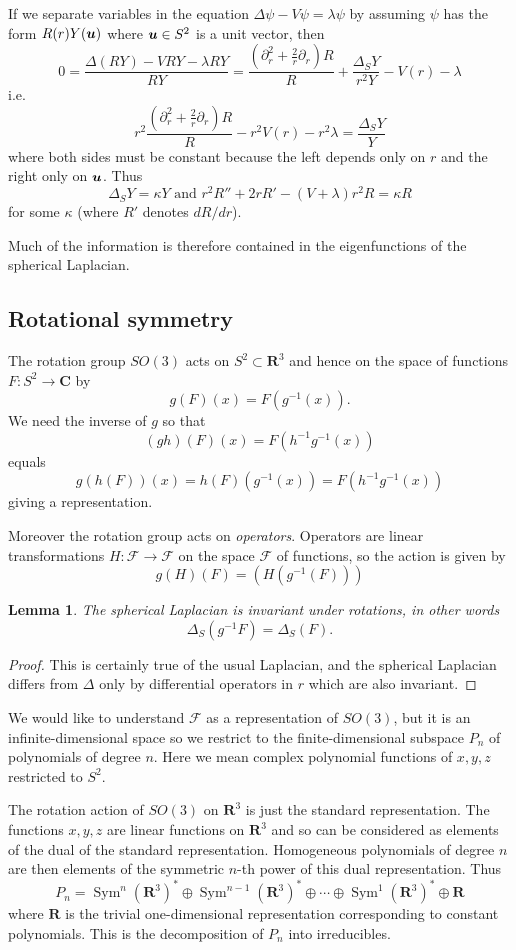 \documentclass[12pt]{article}
\renewcommand\vec[1]{\ensuremath\boldsymbol{#1}}
\newcommand{\CC}{\mathbf{C}}
\newcommand{\RR}{\mathbf{R}}
\newcommand{\OP}{\operatorname}
\newcommand{\Sym}{\OP{Sym}}
\newtheorem{lma}[thm]{Lemma}
\theoremstyle{definition}
\theoremstyle{check}
\theoremstyle{remark}
\theoremstyle{TheoremNum}
\begin{document}
If we separate variables in the equation $\Delta\psi-V\psi=\lambda\psi$ by assuming $\psi$ has the form $R(r)Y(\vec{u})$ where $\vec{u}\in S^2$ is a unit vector, then
\[0=\frac{\Delta(RY)-VRY-\lambda RY}{RY}=\frac{\left(\partial_r^2+\frac{2}{r}\partial_r\right)R}{R}+\frac{\Delta_SY}{r^2Y}-V(r)-\lambda\]
i.e.
\[r^2\frac{\left(\partial_r^2+\frac{2}{r}\partial_r\right)R}{R}-r^2V(r)-r^2\lambda=\frac{\Delta_SY}{Y}\]
where both sides must be constant because the left depends only on $r$ and the right only on $\vec{u}$. Thus
\[\Delta_SY=\kappa Y\mbox{ and }r^2R''+2rR'-(V+\lambda)r^2R=\kappa R\]
for some $\kappa$ (where $R'$ denotes $dR/dr$).

Much of the information is therefore contained in the eigenfunctions of the spherical Laplacian.

\subsection{Rotational symmetry}

The rotation group $SO(3)$ acts on $S^2\subset\RR^3$ and hence on the space of functions $F\colon S^2\to\CC$ by
\[g(F)(x)=F(g^{-1}(x)).\]
We need the inverse of $g$ so that
\[(gh)(F)(x)=F(h^{-1}g^{-1}(x))\]
equals
\[g(h(F))(x)=h(F)(g^{-1}(x))=F(h^{-1}g^{-1}(x))\]
giving a representation.

Moreover the rotation group acts on {\em operators}. Operators are linear transformations $H\colon\mathcal{F}\to\mathcal{F}$ on the space $\mathcal{F}$ of functions, so the action is given by
\[g(H)(F)=(H(g^{-1}(F)))\]

\begin{lma}
The spherical Laplacian is invariant under rotations, in other words
\[\Delta_S(g^{-1}F)=\Delta_S(F).\]
\end{lma}
\begin{proof}
This is certainly true of the usual Laplacian, and the spherical Laplacian differs from $\Delta$ only by differential operators in $r$ which are also invariant.
\end{proof}

We would like to understand $\mathcal{F}$ as a representation of $SO(3)$, but it is an infinite-dimensional space so we restrict to the finite-dimensional subspace $P_n$ of polynomials of degree $n$. Here we mean complex polynomial functions of $x,y,z$ restricted to $S^2$.

The rotation action of $SO(3)$ on $\RR^3$ is just the standard representation. The functions $x,y,z$ are linear functions on $\RR^3$ and so can be considered as elements of the dual of the standard representation. Homogeneous polynomials of degree $n$ are then elements of the symmetric $n$-th power of this dual representation. Thus
\[P_n=\Sym^n(\RR^3)^*\oplus\Sym^{n-1}(\RR^3)^*\oplus\cdots\oplus\Sym^1(\RR^3)^*\oplus\RR\]
where $\RR$ is the trivial one-dimensional representation corresponding to constant polynomials. This is the decomposition of $P_n$ into irreducibles.
\end{document}
